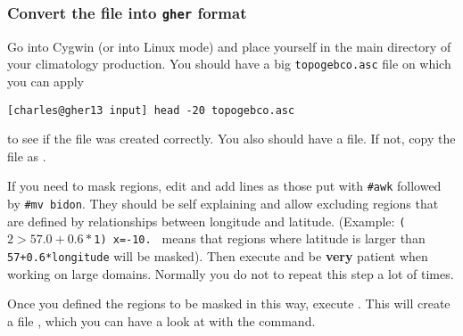 \subsubsection{Convert the file into \texttt{gher} format}

%
%
%
%

Go into Cygwin (or into Linux mode) and place yourself in the main directory of your climatology production. You should have a big {\tt topogebco.asc} file on which you can apply

\begin{lstlisting}[style=Bash]
[charles@gher13 input] head -20 topogebco.asc
\end{lstlisting}

to see if the file was created correctly. You also should have a  file. If not, copy the  file as .

If you need to mask regions, edit  and add lines as those put with {\tt \#awk} followed by {\tt \#mv bidon}. They should be self explaining and allow excluding regions that are defined by relationships between longitude and latitude. (Example: {\tt ($2 > 57.0+0.6*$1) {x=-10.} } means that regions where latitude is larger than \texttt{57+0.6*longitude} will be masked). Then execute  and be {\bf very} patient when working on large domains. Normally you do not to repeat this step a lot of times.

Once you defined the regions to be masked in this way, execute . This will create a file
, which you can have a look at with the  command.

